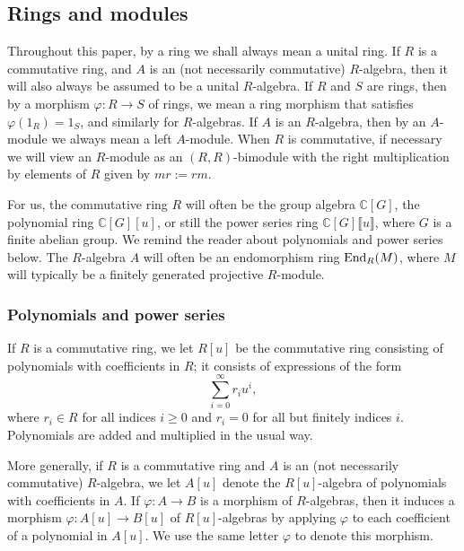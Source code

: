 \documentclass[11pt]{amsart}
\numberwithin{equation}{section}
\theoremstyle{remark}
\theoremstyle{definition}
\begin{document}
\subsection{Rings and modules} \label{section:ring}
Throughout this paper, by a ring we shall always mean a unital ring.  If $R$ is a commutative ring, and $A$ is an (not necessarily commutative) $R$-algebra, then it will also always be assumed to be a unital $R$-algebra.  If $R$ and $S$ are rings, then by a morphism $\varphi:R \rightarrow S$ of rings, we mean a ring morphism that satisfies $\varphi(1_{R}) = 1_{S}$, and similarly for $R$-algebras.  If $A$ is an $R$-algebra, then by an $A$-module we always mean a left $A$-module.  When $R$ is commutative, if necessary we will view an $R$-module as an $(R,R)$-bimodule with the right multiplication by elements of $R$ given by $mr := rm$.  

For us, the commutative ring $R$ will often be the group algebra $\mathbb{C}[G]$, the polynomial ring $\mathbb{C}[G][u]$, or still the power series ring $\mathbb{C}[G]\llbracket u \rrbracket$, where $G$ is a finite abelian group.  We remind the reader about polynomials and power series below.  The $R$-algebra $A$ will often be an endomorphism ring ${\rm End}_{R}(M)$, where $M$ will typically be a finitely generated projective $R$-module.  



\subsubsection{Polynomials and power series} \label{section:pol}
If $R$ is a commutative ring, we let $R[u]$ be the commutative ring consisting of polynomials with coefficients in $R$; it consists of expressions of the form
$$\sum_{i=0}^{\infty} r_{i}u^{i}, $$
where $r_{i}\in R$ for all indices $i \ge 0$ and $r_{i}=0$ for all but finitely indices $i$.  Polynomials are added and multiplied in the usual way.  

More generally, if $R$ is a commutative ring and $A$ is an (not necessarily commutative) $R$-algebra, we let $A[u]$ denote the $R[u]$-algebra of polynomials with coefficients in $A$.  If $\varphi:A \rightarrow B$ is a morphism of $R$-algebras, then it induces a morphism $\varphi:A[u] \rightarrow B[u]$ of $R[u]$-algebras by applying $\varphi$ to each coefficient of a polynomial in $A[u]$.  We use the same letter $\varphi$ to denote this morphism.  
\end{document}
